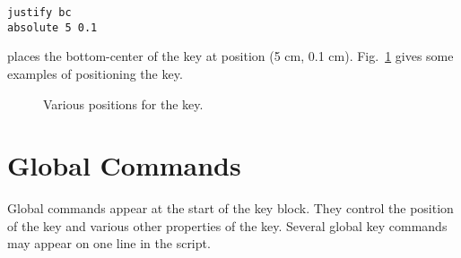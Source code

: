 \preglecode{}
\begin{Verbatim}
justify bc
absolute 5 0.1
\end{Verbatim}
\postglecode{}

\noindent{}places the bottom-center of the key at position (5 cm, 0.1 cm). Fig.~\ref{keypos:fig} gives some examples of positioning the key.

\begin{figure}[tb]
\centering
\mbox{}
\caption{\label{keypos:fig}Various positions for the key.}
\end{figure}

\section{Global Commands}

Global commands appear at the start of the key block. They control the position of the key and various other properties of the key. Several global key commands may appear on one line in the script.

